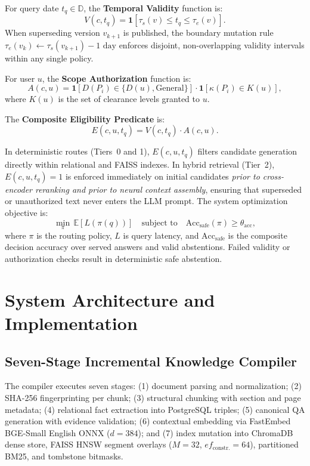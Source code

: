 \documentclass[journal]{IEEEtran}
\newcommand{\D}{\mathbb{D}}
\begin{document}
For query date $t_q\in\D$, the \textbf{Temporal Validity} function is:
\begin{equation}
  V(c,t_q)=\mathbf{1}[\tau_s(v)\le t_q\le\tau_e(v)].
  \label{eq:temporal}
\end{equation}
When superseding version $v_{k+1}$ is published, the boundary mutation rule $\tau_e(v_k)\leftarrow\tau_s(v_{k+1})-1\text{ day}$ enforces disjoint, non-overlapping validity intervals within any single policy.

For user $u$, the \textbf{Scope Authorization} function is:
\begin{equation}
  A(c,u)=\mathbf{1}[D(P_i)\in\{D(u),\text{General}\}]\cdot\mathbf{1}[\kappa(P_i)\in K(u)],
  \label{eq:auth}
\end{equation}
where $K(u)$ is the set of clearance levels granted to $u$.

The \textbf{Composite Eligibility Predicate} is:
\begin{equation}
  E(c,u,t_q)=V(c,t_q)\cdot A(c,u).
  \label{eq:eligibility}
\end{equation}

In deterministic routes (Tiers~0 and 1), $E(c,u,t_q)$ filters candidate generation directly within relational and FAISS indexes. In hybrid retrieval (Tier~2), $E(c,u,t_q)=1$ is enforced immediately on initial candidates \emph{prior to cross-encoder reranking and prior to neural context assembly}, ensuring that superseded or unauthorized text never enters the LLM prompt. The system optimization objective is:
\begin{equation}
  \min_\pi\,\mathbb{E}[L(\pi(q))]\quad\text{subject to}\quad
  \text{Acc}_{\text{safe}}(\pi)\ge\theta_{\text{acc}},
  \label{eq:objective}
\end{equation}
where $\pi$ is the routing policy, $L$ is query latency, and $\text{Acc}_{\text{safe}}$ is the composite decision accuracy over served answers and valid abstentions. Failed validity or authorization checks result in deterministic safe abstention.

\section{System Architecture and Implementation}

\subsection{Seven-Stage Incremental Knowledge Compiler}
The compiler executes seven stages: (1) document parsing and normalization; (2) SHA-256 fingerprinting per chunk; (3) structural chunking with section and page metadata; (4) relational fact extraction into PostgreSQL triples; (5) canonical QA generation with evidence validation; (6) contextual embedding via FastEmbed BGE-Small English ONNX ($d=384$); and (7) index mutation into ChromaDB dense store, FAISS HNSW segment overlays ($M=32$, $ef_{\text{constr.}}=64$), partitioned BM25, and tombstone bitmasks.
\end{document}
